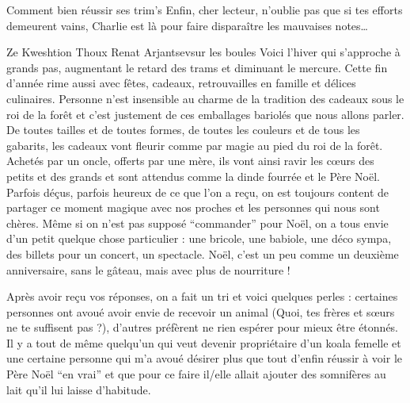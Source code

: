 \begin{spacing}{.94}
\begin{article}{Comment bien réussir ses trim's}
Enfin, cher lecteur, n'oublie pas que si tes efforts demeurent vains, Charlie est là pour faire disparaître les mauvaises notes…
\end{article}
\ligne
\begin{article}{Ze Kweshtion Thoux}
{Renat Arjantsev}{sur les boules}
Voici l'hiver qui s'approche à grands pas, augmentant le retard des trams et diminuant le mercure. Cette fin d’année rime aussi avec fêtes, cadeaux, retrouvailles en famille et délices culinaires. Personne n'est insensible au charme de la tradition des cadeaux sous le roi de la forêt et c'est justement de ces emballages bariolés que nous allons parler.
De toutes tailles et de toutes formes, de toutes les couleurs et de tous les gabarits, les cadeaux vont fleurir comme par magie au pied du roi de la forêt. Achetés par un oncle, offerts par une mère, ils vont ainsi ravir les cœurs des petits et des grands et sont attendus comme la dinde fourrée et le Père Noël. Parfois déçus, parfois heureux de ce que l’on a reçu, on est toujours content de partager ce moment magique avec nos proches et les personnes qui nous sont chères.
Même si on n’est pas supposé \enquote{commander} pour Noël, on a tous envie d’un petit quelque chose particulier : une bricole, une babiole, une déco sympa, des billets pour un concert, un spectacle. Noël, c’est un peu comme un deuxième anniversaire, sans le gâteau, mais avec plus de nourriture !

Après avoir reçu vos réponses, on a fait un tri et voici quelques perles : certaines personnes ont avoué avoir envie de recevoir un animal (Quoi, tes frères et sœurs ne te suffisent pas ?), d’autres préfèrent ne rien espérer pour mieux être étonnés. Il y a tout de même quelqu’un qui veut devenir propriétaire d’un koala femelle et une certaine personne qui m'a avoué désirer plus que tout d’enfin réussir à voir le Père Noël “en vrai” et que pour ce faire il/elle allait ajouter des somnifères au lait qu'il lui laisse d’habitude.


\end{article}
\end{spacing}
